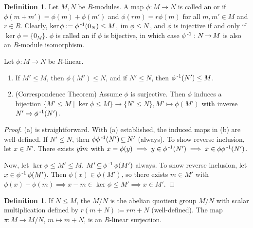 \documentclass[11pt]{book}
\theoremstyle{definition}   \newtheorem{defn}[counter]{Definition} %
\DeclareMathOperator{\ra}{\rightarrow}   \DeclareMathOperator{\Poly}{\mathbf{P}}   \DeclareMathOperator{\spn}{\textnormal{span}}   \DeclareMathOperator{\aut}{\textnormal{Aut}}
\newcommand{\vs}{\vspace{8pt}}
\numberwithin{counter}{chapter}
\begin{document}
\vs

\begin{defn}
Let $M,N$ be $R$-modules. A map $\phi : M \ra N$ is called an  or  if $\phi(m+m') = \phi(m) + \phi(m')$ and $\phi(rm) = r\phi(m)$ for all $m,m' \in M$ and $r \in R$. Clearly, $\ker \phi := \phi\operatorname{^{-1}}(0_N) \leq M$, $\textnormal{im } \phi \leq N$, and $\phi$ is injective if and only if $\ker \phi = \{0_M\}$. $\phi$ is called an  if $\phi$ is bijective, in which case $\phi\inv : N \ra M$ is also an $R$-module isomorphism.
\end{defn}

\vs

\begin{lemma}
Let $\phi : M \ra N$ be $R$-linear.
\begin{enumerate}
\item[(a)] If $M' \leq M$, then $\phi(M') \leq N$, and if $N' \leq N$, then $\phi\operatorname{^{-1}}(N') \leq M$.
\item[(b)] (Correspondence Theorem) Assume $\phi$ is surjective. Then $\phi$ induces a bijection $\{M' \leq M \mid \ker \phi \leq M\} \ra \{N' \leq N\}, M' \mapsto \phi(M')$ with inverse $N' \mapsto \phi\operatorname{^{-1}}(N')$.
\end{enumerate}
\end{lemma}

\begin{proof}
(a) is straightforward. With (a) established, the induced maps in (b) are well-defined. If $N' \leq N$, then $\phi \phi\operatorname{^{-1}}(N') \operatorname{\subseteq} N'$ (always). To show reverse inclusion, let $x \in N'$. There exists $y \mathbf{i} m$ with $x = \phi(y) \implies y \in \phi\operatorname{^{-1}}(N') \implies x \in \phi \phi\operatorname{^{-1}}(N')$.

Now, let $\ker \phi \leq M' \leq M$. $M' \operatorname{\subseteq} \phi\operatorname{^{-1}} \phi(M')$ always. To show reverse inclusion, let $x \in \phi\operatorname{^{-1}} \phi(M')$. Then $\phi(x) \in \phi(M')$, so there exists $m \in M'$ with $\phi(x) - \phi(m) \implies x-m \in \ker \phi \leq M' \implies x \in M'$.
\end{proof}

\vs

\begin{defn}
If $N \leq M$, the  $M/N$ is the abelian quotient group $M/N$ with scalar multiplication defined by $r(m+N) := rm + N$ (well-defined). The map $\pi : M \ra M/N$, $m \mapsto m+N$, is an $R$-linear surjection.
\end{defn}

\vs
\end{document}

